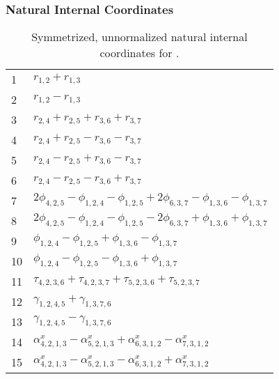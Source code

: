 \documentclass[10pt,oneside]{article}
\begin{document}
\clearpage

\subsubsection*{Natural Internal Coordinates}
\begin{table}[h!]
\centering
\caption{Symmetrized, unnormalized natural internal coordinates for .}
\small
\begin{tabular}{ll}
  1   & $r_{1,2} + r_{1,3}$ \\
  2   & $r_{1,2} - r_{1,3}$ \\
  3   & $r_{2,4} + r_{2,5} + r_{3,6} + r_{3,7}$ \\
  4   & $r_{2,4} + r_{2,5} - r_{3,6} - r_{3,7}$ \\
  5   & $r_{2,4} - r_{2,5} + r_{3,6} - r_{3,7}$ \\
  6   & $r_{2,4} - r_{2,5} - r_{3,6} + r_{3,7}$ \\
  7   & $2\phi_{4,2,5} - \phi_{1,2,4} - \phi_{1,2,5} + 2\phi_{6,3,7} - \phi_{1,3,6} - \phi_{1,3,7}$ \\
  8   & $2\phi_{4,2,5} - \phi_{1,2,4} - \phi_{1,2,5} - 2\phi_{6,3,7} + \phi_{1,3,6} + \phi_{1,3,7}$ \\
  9   & $\phi_{1,2,4} - \phi_{1,2,5} + \phi_{1,3,6} - \phi_{1,3,7}$ \\
  10  & $\phi_{1,2,4} - \phi_{1,2,5} - \phi_{1,3,6} + \phi_{1,3,7}$ \\
  11  & $\tau_{4,2,3,6} + \tau_{4,2,3,7} + \tau_{5,2,3,6} + \tau_{5,2,3,7}$ \\
  12  & $\gamma_{1,2,4,5} + \gamma_{1,3,7,6}$ \\
  13  & $\gamma_{1,2,4,5} - \gamma_{1,3,7,6}$ \\
  14  & $\alpha^x_{4,2,1,3} - \alpha^x_{5,2,1,3} + \alpha^x_{6,3,1,2} - \alpha^x_{7,3,1,2}$ \\
  15  & $\alpha^x_{4,2,1,3} - \alpha^x_{5,2,1,3} - \alpha^x_{6,3,1,2} + \alpha^x_{7,3,1,2}$ \\
\end{tabular}
\end{table}

\clearpage

\subsection{\ \ \ }
\end{document}
